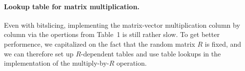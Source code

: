 


\paragraph{Lookup table for matrix multiplication.}
Even with bitslicing, implementing the matrix-vector multiplication column by column via the opertions from Table~1 is still rather slow.
To get better performence, we capitalized on the fact that the random matrix $R$ is fixed, and we can therefore set up $R$-dependent tables and use table lookups in the implementation of the multiply-by-$R$ operation.

